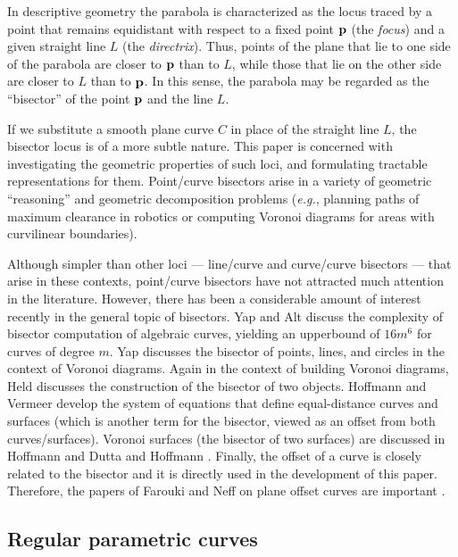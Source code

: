 In descriptive geometry \cite{coxeter69} the parabola is
characterized as the locus traced by a point that remains
equidistant with respect to a fixed point ${\bf p}$ (the
{\it focus\/}) and a given straight line $L$ (the {\it
directrix\/}). Thus, points of the plane that lie to one
side of the parabola are closer to ${\bf p}$ than to $L$,
while those that lie on the other side are closer to $L$
than to ${\bf p}$. In this sense, the parabola may be
regarded as the ``bisector'' of the point ${\bf p}$ and
the line $L$.

If we substitute a smooth plane curve $C$ in place of
the straight line $L$, the bisector locus is of a more
subtle nature. This paper is concerned with investigating
the geometric properties of such loci, and formulating
tractable representations for them. Point/curve bisectors
arise in a variety of geometric ``reasoning'' and geometric
decomposition problems ({\it e.g.}, planning paths of maximum
clearance in robotics or computing Voronoi diagrams for areas
with curvilinear boundaries). 

Although simpler than other
loci --- line/curve and curve/curve bisectors --- that arise
in these contexts, point/curve bisectors have not attracted
much attention in the literature.
However, there has been a considerable amount of interest recently in
the general topic of bisectors.
Yap and Alt \cite{yap89} discuss the complexity of bisector computation of 
algebraic curves, yielding an upperbound of $16m^6$ for curves of degree $m$.
Yap \cite{yap87} discusses the bisector of points, lines, and circles in the 
context of Voronoi diagrams.
Again in the context of building Voronoi diagrams, Held \cite{Held91}
discusses the construction of the bisector of two objects.
Hoffmann and Vermeer \cite{HV91} develop the system of equations that define
equal-distance curves and surfaces (which is another term for the bisector,
viewed as an offset from both curves/surfaces).
Voronoi surfaces (the bisector of two surfaces) are discussed in 
Hoffmann \cite{H90} and Dutta and Hoffmann \cite{DH90}.
Finally, the offset of a curve is closely related to the bisector
and it is directly used in the development of this paper.
Therefore, the papers of Farouki and Neff on plane
offset curves are important \cite{farouki90a,farouki90b}.


\subsection{Regular parametric curves}

